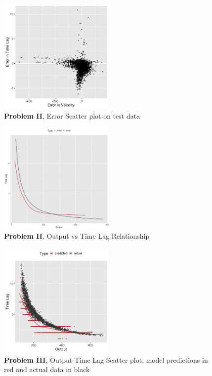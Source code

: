 \documentclass[twoside]{article}
\begin{document}
\begin{figure}[h]\label{fig:problem2_error}
\vspace{.3in}
\centerline{\includegraphics[width=0.5\textwidth]{figures/exp2_scatter_errors_test.png}}
\vspace{.3in}
\caption{\textbf{Problem II}, Error Scatter plot on test data}
\end{figure}

\begin{figure}[h]\label{fig:problem2_curves}
\vspace{.3in}
\centerline{\includegraphics[width=0.5\textwidth]{figures/exp2_predictive_curves.png}}
\vspace{.3in}
\caption{\textbf{Problem II}, Output vs Time Lag Relationship}
\end{figure}



\begin{figure}[h]
\vspace{.3in}
\centerline{\includegraphics[width=0.5\textwidth]{figures/exp3_scatter_v_tl.png}}
\vspace{.3in}
\caption{\textbf{Problem III}, Output-Time Lag Scatter plot; model predictions in red and actual data in black}
\end{figure}
\end{document}
